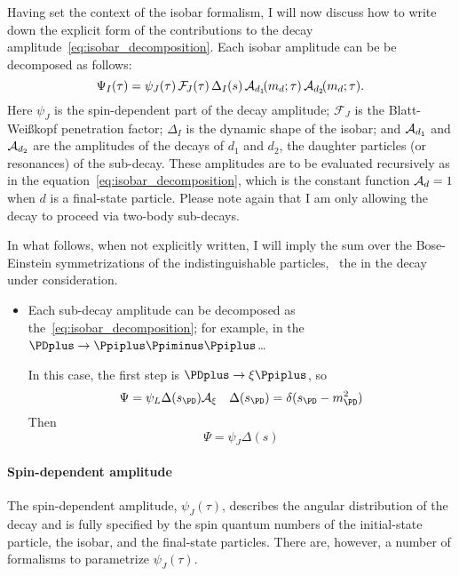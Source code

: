     Having set the context of the isobar formalism, I will now discuss how to write down the explicit form of the contributions to the decay amplitude~\eqref{eq:isobar_decomposition}.
    Each isobar amplitude can be be decomposed as follows:
    \begin{equation}\label{eq:isobar_amplitude}
        \Psi_I(\tau) = \psi_J(\tau)\,\mathcal{F\!}_{J}(\tau)\,\Delta_I(s)\,\mathcal{A}_{d_1}\!(m_d; \tau)\,\mathcal{A}_{d_2}\!(m_d; \tau).
    \end{equation}
    Here $\psi_J$ is the spin-dependent part of the decay amplitude;
    $\mathcal{F\!}_J$ is the Blatt-Wei\ss{}kopf penetration factor;
    $\Delta_I$ is the dynamic shape of the isobar;
    and $\mathcal{A}_{d_1}$ and $\mathcal{A}_{d_2}$ are the amplitudes of the decays of $d_1$ and $d_2$, the daughter particles (or resonances) of the sub-decay.
    These amplitudes are to be evaluated recursively as in the equation~\eqref{eq:isobar_decomposition}, which is the constant function $\mathcal{A}_d = 1$ when $d$ is a final-state particle.
    Please note again that I am only allowing the decay to proceed via two-body sub-decays.


    In what follows, when not explicitly written, I will imply the sum over the Bose-Einstein symmetrizations of the indistinguishable particles, \ie~the \Ppiplus{} in the \PDplus{} decay under consideration.

    {\color{red}
    \begin{itemize}
        \item Each sub-decay amplitude can be decomposed as the~\eqref{eq:isobar_decomposition}; for example, in the $\PDplus\to\Ppiplus\Ppiminus\Ppiplus$\dots

            In this case, the first step is $\PDplus \to\xi\Ppiplus$, so
            \begin{equation}
                \Psi = \psi_L \Delta(s_{\PD})\A_\xi
                \quad
                \Delta(s_{\PD}) = \delta(s_{\PD} - m_{\PD}^2)
            \end{equation}
            Then
            \begin{equation}
                \Psi = \psi_J \Delta(s)
            \end{equation}

    \end{itemize}
    }

    \paragraph{Spin-dependent amplitude}
    The spin-dependent amplitude, $\psi_J(\tau)$, describes the angular distribution of the decay and is fully specified by the spin quantum numbers of the initial-state particle, the isobar, and the final-state particles.
    There are, however, a number of formalisms to parametrize $\psi_J(\tau)$.
    

